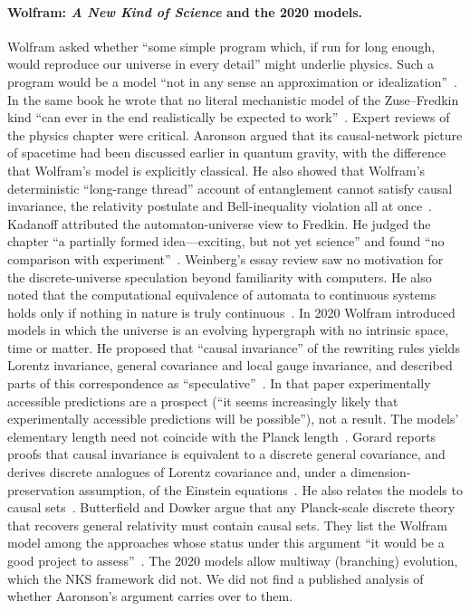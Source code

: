 \paragraph{Wolfram: \emph{A New Kind of Science} and the 2020 models.} Wolfram
asked whether ``some simple program which, if run for long enough, would
reproduce our universe in every detail'' might underlie physics. Such a program
would be a model ``not in any sense an approximation or
idealization''~\cite{Wolfram2002new}. In the same book he wrote that no literal
mechanistic model of the Zuse--Fredkin kind ``can ever in the end realistically
be expected to work''~\cite[p.~1026]{Wolfram2002new}. Expert reviews of the
physics chapter were critical. Aaronson argued that its causal-network picture
of spacetime had been discussed earlier in quantum gravity, with the difference
that Wolfram's model is explicitly classical. He also showed that Wolfram's
deterministic ``long-range thread'' account of entanglement cannot satisfy
causal invariance, the relativity postulate and Bell-inequality violation all
at once~\cite{Aaronson2002book}. Kadanoff attributed the automaton-universe view
to Fredkin. He judged the chapter ``a partially formed idea---exciting, but not
yet science'' and found ``no comparison with experiment''~\cite{Kadanoff2002new}.
Weinberg's essay review saw no motivation for the discrete-universe speculation
beyond familiarity with computers. He also noted that the computational
equivalence of automata to continuous systems holds only if nothing in nature is
truly continuous~\cite{Weinberg2002is}. In 2020 Wolfram introduced models in
which the universe is an evolving hypergraph with no intrinsic space, time or
matter. He proposed that ``causal invariance'' of the rewriting rules yields
Lorentz invariance, general covariance and local gauge invariance, and
described parts of this correspondence as ``speculative''~\cite{Wolfram2020class}.
In that paper experimentally accessible predictions are a prospect (``it seems
increasingly likely that experimentally accessible predictions will be
possible''), not a result. The models' elementary length need not coincide with
the Planck length~\cite{Wolfram2020class}. Gorard reports proofs that causal
invariance is equivalent to a discrete general covariance, and derives discrete
analogues of Lorentz covariance and, under a dimension-preservation assumption,
of the Einstein equations~\cite{Gorard2020some}. He also relates the models to
causal sets~\cite{Gorard2020algorithmic}. Butterfield and Dowker argue that any
Planck-scale discrete theory that recovers general relativity must contain
causal sets. They list the Wolfram model among the approaches whose status
under this argument ``it would be a good project to
assess''~\cite{Butterfield2024recovering}. The 2020 models allow multiway
(branching) evolution, which the NKS framework did not. We did not find a
published analysis of whether Aaronson's argument carries over to them.

